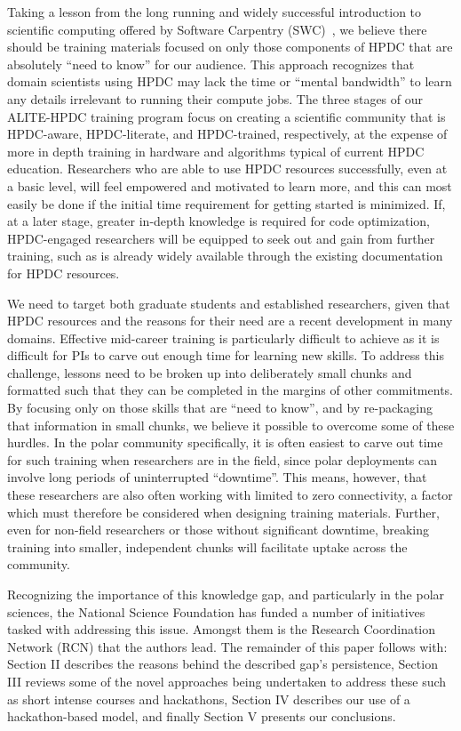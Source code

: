 \documentclass[conference]{IEEEtran}
\begin{document}
Taking a lesson from the long running and widely successful introduction to scientific computing offered by Software Carpentry (SWC)~\cite{Wilson2014-pc}, we believe there should be training materials focused on only those components of HPDC that are absolutely ``need to know'' for our audience. This approach recognizes that domain scientists using HPDC may lack the time or ``mental bandwidth'' to learn any details irrelevant to running their compute jobs. The three stages of our ALITE-HPDC training program focus on creating a scientific community that is HPDC-aware, HPDC-literate, and HPDC-trained, respectively, at the expense of more in depth training in hardware and algorithms typical of current HPDC education.  Researchers who are able to use HPDC resources successfully, even at a basic level, will feel empowered and motivated to learn more, and this can most easily be done if the initial time requirement for getting started is minimized. If, at a later stage, greater in-depth knowledge is required for code optimization, HPDC-engaged researchers will be equipped to seek out and gain from further training, such as is already widely available through the existing documentation for HPDC resources.


We need to target both graduate students and established researchers, given that HPDC resources and the reasons for their need are a recent development in many domains. Effective mid-career training is particularly difficult to achieve as it is difficult for PIs to carve out enough time for learning new skills. To address this challenge, lessons need to be broken up into deliberately small chunks and formatted such that they can be completed in the margins of other commitments. By focusing only on those skills that are ``need to know'', and by re-packaging that information in small chunks, we believe it possible to overcome some of these hurdles.  In the polar community specifically, it is often easiest to carve out time for such training when researchers are in the field, since polar deployments can involve long periods of uninterrupted ``downtime''.  This means, however, that these researchers are also often working with limited to zero connectivity, a factor which must therefore be considered when designing training materials. Further, even for non-field researchers or those without significant downtime, breaking training into smaller, independent chunks will facilitate uptake across the community.

Recognizing the importance of this knowledge gap, and particularly in the polar sciences, the National Science Foundation has funded a number of initiatives tasked with addressing this issue.  Amongst them is the Research Coordination Network (RCN) that the authors lead. The remainder of this paper follows with: Section II describes the reasons behind the described gap's persistence, Section III reviews some of the novel approaches being undertaken to address these such as short intense courses and hackathons, Section IV describes our use of a hackathon-based model, and finally Section V presents our conclusions.
\end{document}
